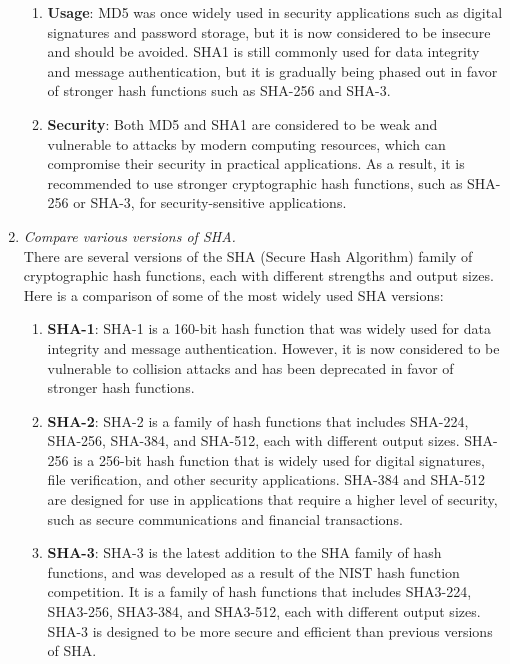 \documentclass[11pt]{article}
\begin{document}
\begin{enumerate}
\begin{enumerate}
              \item \textbf{Usage}: MD5 was once widely used in security applications such as digital signatures and password storage, but it is now considered to be insecure and should be avoided. SHA1 is still commonly used for data integrity and message authentication, but it is gradually being phased out in favor of stronger hash functions such as SHA-256 and SHA-3.

              \item \textbf{Security}: Both MD5 and SHA1 are considered to be weak and vulnerable to attacks by modern computing resources, which can compromise their security in practical applications. As a result, it is recommended to use stronger cryptographic hash functions, such as SHA-256 or SHA-3, for security-sensitive applications.
          \end{enumerate}

    \item \textit{Compare various versions of SHA.} \\

          There are several versions of the SHA (Secure Hash Algorithm) family of cryptographic hash functions, each with different strengths and output sizes. Here is a comparison of some of the most widely used SHA versions:

          \begin{enumerate}
              \item \textbf{SHA-1}: SHA-1 is a 160-bit hash function that was widely used for data integrity and message authentication. However, it is now considered to be vulnerable to collision attacks and has been deprecated in favor of stronger hash functions.

              \item \textbf{SHA-2}: SHA-2 is a family of hash functions that includes SHA-224, SHA-256, SHA-384, and SHA-512, each with different output sizes. SHA-256 is a 256-bit hash function that is widely used for digital signatures, file verification, and other security applications. SHA-384 and SHA-512 are designed for use in applications that require a higher level of security, such as secure communications and financial transactions.

              \item \textbf{SHA-3}: SHA-3 is the latest addition to the SHA family of hash functions, and was developed as a result of the NIST hash function competition. It is a family of hash functions that includes SHA3-224, SHA3-256, SHA3-384, and SHA3-512, each with different output sizes. SHA-3 is designed to be more secure and efficient than previous versions of SHA.


\end{enumerate}
\end{enumerate}
\end{document}

